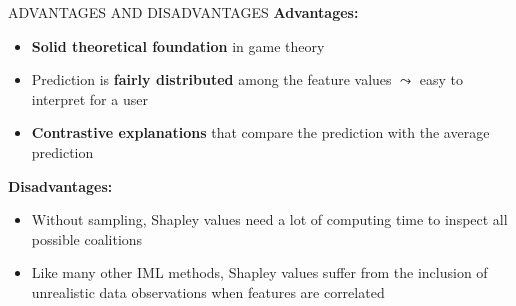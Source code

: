 \documentclass[11pt,compress,t,notes=noshow, aspectratio=169, xcolor=table]{beamer}
\begin{document}
\begin{frame}{ADVANTAGES AND DISADVANTAGES}
	\textbf{Advantages:}
	\begin{itemize}
	 \item \textbf{Solid theoretical foundation} in game theory
        \item Prediction is \textbf{fairly distributed} among the feature values $\leadsto$ easy to interpret for a user
        \item \textbf{Contrastive explanations} that compare the prediction with the average prediction
	\end{itemize}
\vspace{0.25cm}
	\textbf{Disadvantages:}
	\begin{itemize}
		\item Without sampling, Shapley values need a lot of computing time to
		inspect all possible coalitions
		\item Like many other IML methods, Shapley values suffer from the
		inclusion of unrealistic data observations when features are correlated
	\end{itemize}



\end{frame}

\endlecture
\end{document}
